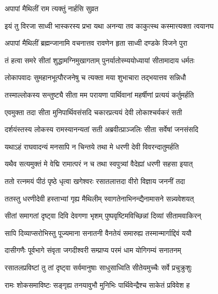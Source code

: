 
अपापां मैथिलीं राम त्यक्तुं नार्हसि सुव्रत

\twolineshloka
{इयं तु विरजा साध्वी भास्करस्य प्रभा यथा}
{अनन्या तव काकुत्स्थ कस्मात्त्यक्ता त्वयानघ}%


\twolineshloka
{अपापां मैथिलीं ब्रह्मन्जानामि वचनात्तव}
{रावणेन हृता साध्वी दण्डके विजने पुरा}%

\twolineshloka
{तं हत्वा समरे सीतां शुद्धामग्निमुखागताम्}
{पुनर्यातोस्म्ययोध्यायां सीतामादाय धर्मतः}%

\twolineshloka
{लोकापवादः सुमहानभूत्पौरजनेषु च}
{त्यक्ता मया शुभाचारा तद्भयात्तव सन्निधौ}%

\twolineshloka
{तस्माल्लोकस्य सन्तुष्ट्यै सीता मम परायणा}
{पार्थिवानां महर्षीणां प्रत्ययं कर्तुमर्हति}%


\twolineshloka
{एवमुक्ता तदा सीता मुनिपार्थिवसंसदि}
{चकारप्रत्ययं देवी लोकाश्चर्यकरं सती}%

\twolineshloka
{दर्शयंस्तस्य लोकस्य रामस्यानन्यतां सती}
{अब्रवीत्प्राञ्जलिः सीता सर्वेषां जनसंसदि}%


\twolineshloka
{यथाऽहं राघवादन्यं मनसापि न चिन्तये}
{तथा मे धरणी देवी विवरन्दातुमर्हति}%

\twolineshloka
{यथैव सत्यमुक्तं मे वेद्मि रामात्परं न च}
{तथा स्वपुत्र्यां वैदेह्यां धरणी सहसा इयात्}%


\twolineshloka
{ततो रत्नमयं पीठं पृष्ठे धृत्वा खगेश्वरः}
{रसातलात्तदा वीरो विज्ञाय जननीं तदा}%

\twolineshloka
{ततस्तु धरणीदेवी हस्ताभ्यां गृह्य मैथिलीम्}
{स्वागतेनाभिनन्द्यैनामासने सन्न्यवेशयत्}%

\twolineshloka
{सीतां समागतां दृष्ट्वा दिवि देवगणा भृशम्}
{पुष्पवृष्टिमविच्छिन्नां दिव्यां सीतामवाकिरन्}%

\twolineshloka
{सापि दिव्याप्सरोभिस्तु पूज्यमाना सनातनी}
{वैनतेयं समारुह्य तस्मान्मार्गाद्दिवं ययौ}%

\twolineshloka
{दासीगणैः पूर्वभागे संवृता जगदीश्वरी}
{सम्प्राप्य परमं धाम योगिगम्यं सनातनम्}%

\twolineshloka
{रसातलप्रविष्टां तु तां दृष्ट्वा सर्वमानुषाः}
{साधुसाध्विति सीतेयमुच्चैः सर्वे प्रचुक्रुशुः}%

\twolineshloka
{रामः शोकसमाविष्टः सङ्गृह्य तनयावुभौ}
{मुनिभिः पार्थिवेन्द्रैश्च साकेतं प्रविवेश ह}%

